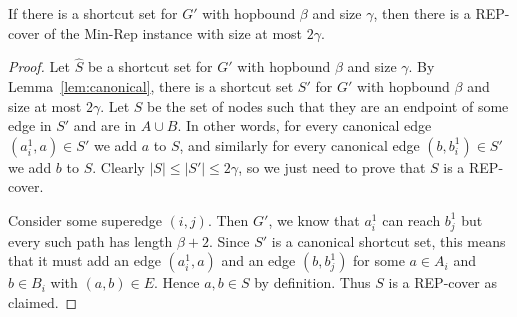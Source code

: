 \begin{lemma} \label{lem:soundness}
    If there is a shortcut set for $G'$ with hopbound $\beta$ and size $\gamma$, then there is a REP-cover of the Min-Rep instance with size at most $2\gamma$.
\end{lemma}
\begin{proof}
    Let $\hat S$ be a shortcut set for $G'$ with hopbound $\beta$ and size $\gamma$.  By Lemma~\ref{lem:canonical}, there is a shortcut set $S'$ for $G'$ with hopbound $\beta$ and size at most $2\gamma$.  Let $S$ be the set of nodes such that they are an endpoint of some edge in $S'$ and are in $A \cup B$.  In other words, for every canonical edge $(a_i^1, a) \in S'$ we add $a$ to $S$, and similarly for every canonical edge $(b, b_i^1) \in S'$ we add $b$ to $S$.  Clearly $|S| \leq |S'| \leq 2\gamma$, so we just need to prove that $S$ is a REP-cover.

    Consider some superedge $(i,j)$.  Then $G'$, we know that $a_i^1$ can reach $b_j^1$ but every such path has length $\beta+2$.  Since $S'$ is a canonical shortcut set, this means that it must add an edge $(a_i^1, a)$ and an edge $(b, b_j^1)$ for some $a \in A_i$ and $b \in B_i$ with $(a,b) \in E$.  Hence $a,b \in S$ by definition.  Thus $S$ is a REP-cover as claimed.  
\end{proof}

